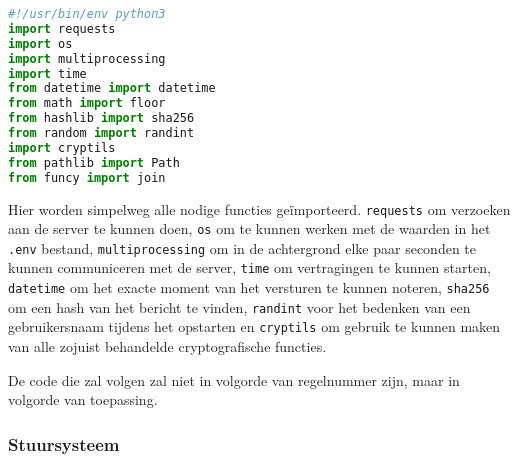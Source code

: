 \documentclass{report} %
\let\code\lstinline
\begin{document}
\begin{lstlisting}[language=python]
#!/usr/bin/env python3
import requests
import os
import multiprocessing
import time
from datetime import datetime
from math import floor
from hashlib import sha256
from random import randint
import cryptils
from pathlib import Path
from funcy import join
\end{lstlisting}
Hier worden simpelweg alle nodige functies geïmporteerd. \code{requests} om verzoeken aan de server te kunnen doen, \code{os} om te kunnen werken met de waarden in het \code{.env} bestand, \code{multiprocessing} om in de achtergrond elke paar seconden te kunnen communiceren met de server, \code{time} om vertragingen te kunnen starten, \code{datetime} om het exacte moment van het versturen te kunnen noteren, \code{sha256} om een hash van het bericht te vinden, \code{randint} voor het bedenken van een gebruikersnaam tijdens het opstarten en \code{cryptils} om gebruik te kunnen maken van alle zojuist behandelde cryptografische functies.
\par De code die zal volgen zal niet in volgorde van regelnummer zijn, maar in volgorde van toepassing.

\subsubsection{Stuursysteem}
\end{document}
